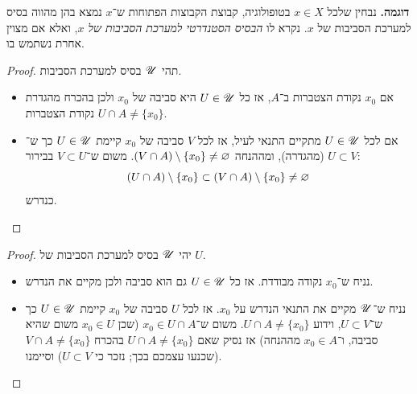 \documentclass[name=רשימות טופולוגיה כללית]{../../../tex/classes/noChapterMegasumPreamble}
\begin{document}
	\textbf{דוגמה. }נבחין שלכל $x \in X$ בטופולוגיה, קבוצת הקבוצות הפתוחות ש־$x$ נמצא בהן מהווה בסיס למערכת הסביבות של $x$. נקרא לו \textit{הבסיס הסטנדרטי למערכת הסביבות של $x$}, ואלא אם מצוין אחרת נשתמש בו. 
	\begin{proof}תהי $\mathscr{U}$ בסיס למערכת הסביבות. 
		\begin{itemize}
			\item[$\implies$] אם $x_0$ נקודת הצטברות ב־$A$, אז כל $U \in \mathscr{U}$ היא סביבה של $x_0$ ולכן בהכרח מהגדרת נקודת הצטברות $U \cap A \neq \{x_0\}$. 
			\item[$\impliedby$] אם לכל $U \in \mathscr{U}$ מתקיים התנאי לעיל, אז לכל $V$ סביבה של $x_0$ קיימת $U \in \mathscr{U}$ כך ש־$U \subset V$ (מהגדרה), ומההנחה $(V \cap A) \setminus \{x_0\} \neq \varnothing$. משום ש־$V \subset U$ בבירור:
			\[ (U \cap A) \setminus \{x_0\} \subset (V \cap A) \setminus \{x_0\} \neq \varnothing \]
			כנדרש. 
		\end{itemize}
	\end{proof}
	\begin{proof}יהי $\mathscr{U}$ בסיס למערכת הסביבות של $U$. 
		\begin{itemize}
			\item[$\implies$]נניח ש־$x_0$ נקודה מבודדת. אז כל $U \in \mathscr{U}$ גם הוא סביבה ולכן מקיים את הנדרש. 
			\item[$\impliedby$]נניח ש־$\mathscr{U}$ מקיים את התנאי הנדרש על $x_0$. אז לכל $U$ סביבה של $x_0$ קיימת $U \in \mathscr{U}$ כך ש־$U \subset V$, וידוע $U \cap A \neq \{x_0\}$. משום ש־$x_0 \in U \cap A$ (שכן $x_0 \in U$ משום שהיא סביבה, ו־$x_0 \in A$ מההנחה) אז נסיק שאם $U \cap A \neq \{x_0\}$ בהכרח $V \cap A \neq \{x_0\}$ (שכנעו עצמכם בכך; נזכר כי $U \subset V$) וסיימנו. 
		\end{itemize}\envendproof
	\end{proof}
\end{document}
